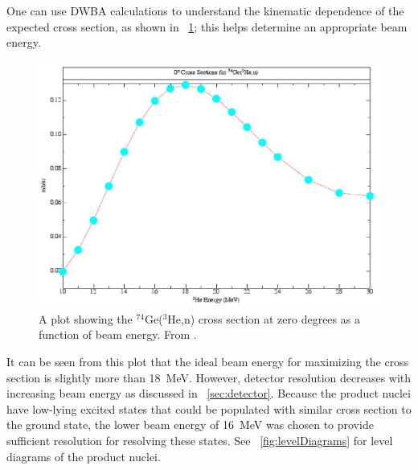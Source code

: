 One can use DWBA calculations to understand the kinematic dependence of the expected cross section, as shown in {\fig}~\ref{fig:optimizeCrossSection}; this helps determine an appropriate beam energy.  
\begin{figure}[htp]
\centering
\includegraphics[width=1.0\textwidth]{figures/74Ge_0plus_xsection.eps}
\caption[The $^{74}$Ge($^3$He,n) \zp cross section at zero degrees as a function of beam energy.]{A plot showing the $^{74}$Ge($^3$He,n) \zp cross section at zero degrees as a function of beam energy.  From \citep{schiffer_privateCommunication}.}
\label{fig:optimizeCrossSection}
\end{figure}
It can be seen from this plot that the ideal beam energy for maximizing the \reaction cross section is slightly more than 18~MeV.  However, detector resolution decreases with increasing beam energy as discussed in {\sect}~\ref{sec:detector}.  Because the product nuclei \SeProducts have low-lying excited \tp states that could be populated with similar cross section to the ground state, the lower beam energy of 16~MeV was chosen to provide sufficient resolution for resolving these states.  See {\fig}~\ref{fig:levelDiagrams} for level diagrams of the product nuclei.
